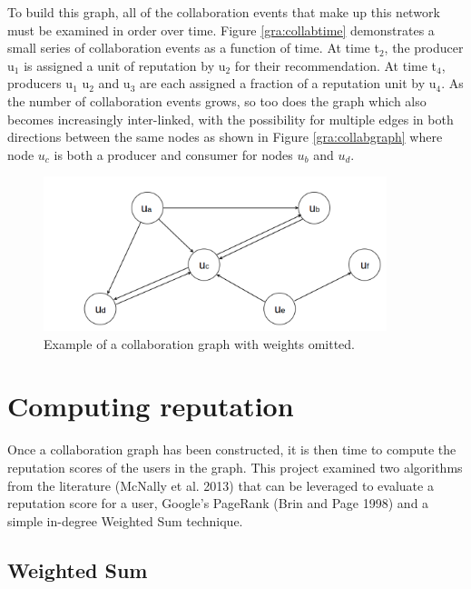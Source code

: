 \documentclass[]{final_report}
\begin{document}
To build this graph, all of the collaboration events that make up this network must be examined in order over time. Figure \ref{gra:collabtime} demonstrates a small series of collaboration events as a function of time. At time t$_{2}$, the producer u$_{1}$ is assigned a unit of reputation by u$_{2}$ for their recommendation. At time t$_{4}$, producers u$_{1}$ u$_{2}$ and u$_{3}$ are each assigned a fraction of a reputation unit by u$_{4}$. As the number of collaboration events grows, so too does the graph which also becomes increasingly inter-linked, with the possibility for multiple edges in both directions between the same nodes as shown in Figure \ref{gra:collabgraph} where node $u_{c}$ is both a producer and consumer for nodes $u_{b}$ and $u_{d}$.

\begin{figure}[ht!]
\centering
\includegraphics[width=100mm]{chap3/collabgraph.png}
\caption{Example of a collaboration graph with weights omitted.}
\end{figure}\label{gra:collabgraph}

\section{Computing reputation}

Once a collaboration graph has been constructed, it is then time to compute the reputation scores of the users in the graph. This project examined two algorithms from the literature (McNally et al. 2013) that can be leveraged to evaluate a reputation score for a user, Google's PageRank (Brin and Page 1998) and a simple in-degree Weighted Sum technique.

\subsection{Weighted Sum}
\end{document}
